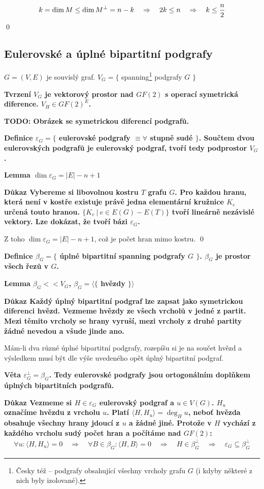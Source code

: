 \documentclass[a4paper,12pt,titlepage]{article}
\newcommand{\lm}{\smallskip\noindent\bf Lemma\rm{} }
\newcommand{\dk}{\smallskip\noindent\bf Důkaz\rm{} }
\newcommand{\df}{\smallskip\noindent\bf Definice\rm{} }
\newcommand{\vt}{\smallskip\noindent\bf Věta\rm{} }
\newcommand{\tv}{\smallskip\noindent\bf Tvrzení\rm{} }
\newcommand{\todo}[1]{\bf TODO: \rm#1}
\newcommand{\sk}[1]{{\langle #1\rangle}}
\begin{document}
$$k = \dim M \le \dim M^\bot = n-k \quad\Rightarrow\quad 2k \le n \quad\Rightarrow\quad k \le {n\over 2}$$
\qed

\subsection{Eulerovské a úplné bipartitní podgrafy}

$G = (V,E)$ je souvislý graf. $V_G = \{$ spanning\footnote{Česky též  -- podgrafy obsahující všechny vrcholy grafu $G$ (i kdyby některé z nich byly izolované).} podgrafy $G$ $\}$

\tv $V_G$ je vektorový prostor nad $GF(2)$ s operací symetrická diference. $V_H \in GF(2)^E$.

\bigskip
\todo Obrázek se symetrickou diferencí podgrafů.
\bigskip

\df $\varepsilon_G = \{ $ eulerovské podgrafy $\equiv
\forall $ stupně sudé $ \}$. Součtem dvou eulerovských podgrafů je eulerovský
podgraf, tvoří tedy podprostor $V_G$.

\lm $\dim \varepsilon_G = |E| - n + 1$

\dk Vybereme si libovolnou kostru $T$ grafu $G$. Pro každou hranu, která není v
kostře existuje právě jedna elementární kružnice $K_e$ určená touto hranou. $\{
K_e\ |\ e \in E(G) - E(T) \}$ tvoří lineárně nezávislé vektory. Lze dokázat,
že tvoří bázi $\varepsilon_G$.

Z toho $\dim \varepsilon_G = |E| - n + 1$, což je počet hran mimo kostru. \qed

\df $\beta_G = \{$ úplné bipartitní spanning podgrafy $G$ $\}$. $\beta_G$ je
prostor všech řezů v $G$.

\lm $\beta_G << V_G$, $\beta_G = \langle\{$ hvězdy $\}\rangle$

\dk Každý úplný bipartitní podgraf lze zapsat jako symetrickou diferenci hvězd.
Vezmeme hvězdy ze všech vrcholů v jedné z partit. Mezi těmito vrcholy se hrany
vyruší, mezi vrcholy z druhé partity žádné nevedou a všude jinde ano. 

Mám-li dva různé úplné bipartitní podgrafy, rozepíšu si je na součet hvězd a
výsledkem musí být dle výše uvedeného opět úplný bipartitní podgraf.

\vt $\varepsilon_G^\bot = \beta_G$. Tedy eulerovské podgrafy jsou ortogonálním
doplňkem úplných bipartitních podgrafů.

\dk Vezmeme si $H \in \varepsilon_G$ eulerovský podgraf a $u \in V(G)$. $H_u$
označíme hvězdu z vrcholu $u$. Platí $\sk{H,H_u} = \deg_H u$, neboť hvězda
obsahuje všechny hrany jdoucí z $u$ a žádné jiné. Protože v $H$ vychází z
každého vrcholu sudý počet hran a počítáme nad $GF(2)$:
\begin{align*}
\forall u: \sk{H,H_u} = 0 \quad\Rightarrow\quad \forall B\in \beta_G: \sk{H,B} = 0 \quad\Rightarrow\quad H \in \beta_G^\bot \quad\Rightarrow\quad \varepsilon_G \subseteq \beta_G^\bot
\end{align*}
\end{document}

